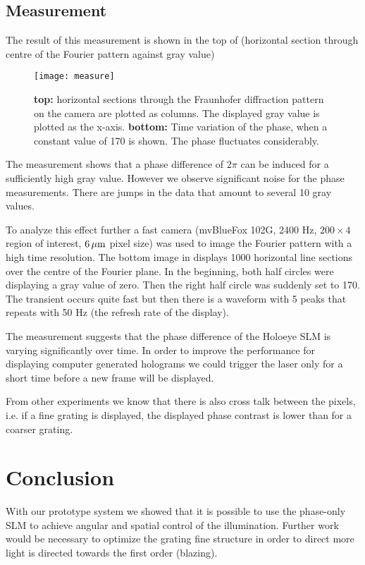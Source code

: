\subsection{Measurement}
The result of this measurement is shown in the top of
(horizontal section through centre of
the Fourier pattern against gray value)
\begin{figure}[!hbt]
  \centering
  \texttt{[image: measure]}
  \caption{{\bf top:} horizontal sections through the Fraunhofer
    diffraction pattern on the camera are plotted as columns. The
    displayed gray value is plotted as the x-axis. {\bf bottom:} Time
    variation of the phase, when a constant value of 170 is shown. The
    phase fluctuates considerably.}
  \label{fig:holo-transfer}
\end{figure}
The measurement shows that a phase difference of $2\pi$ can be induced
for a sufficiently high gray value. However we observe significant
noise for the phase measurements.  There are jumps in the data that
amount to several 10 gray values. 

To analyze this effect further a fast camera (mvBlueFox 102G, 2400 Hz,
$200\times4$ region of interest, $\unit[ 6]{\mu m}$ pixel size) was
used to image the Fourier pattern with a high time resolution.  The
bottom image in  displays 1000 horizontal
line sections over the centre of the Fourier plane. In the beginning,
both half circles were displaying a gray value of zero. Then the right
half circle was suddenly set to 170. The transient occurs quite fast
but then there is a waveform with 5 peaks that repeats with 50 Hz (the
refresh rate of the display).

The measurement suggests that the phase difference of the Holoeye SLM
is varying significantly over time. In order to improve the
performance for displaying computer generated holograms we could
trigger the laser only for a short time before a new frame will be
displayed.

From other experiments we know that there is also cross talk between
the pixels, i.e. if a fine grating is displayed, the displayed phase
contrast is lower than for a coarser grating.
\section{Conclusion}
With our prototype system we showed that it is possible to use the
phase-only SLM to achieve angular and spatial control of the
illumination. Further work would be necessary to optimize the grating
fine structure in order to direct more light is directed towards the
first order (blazing).

